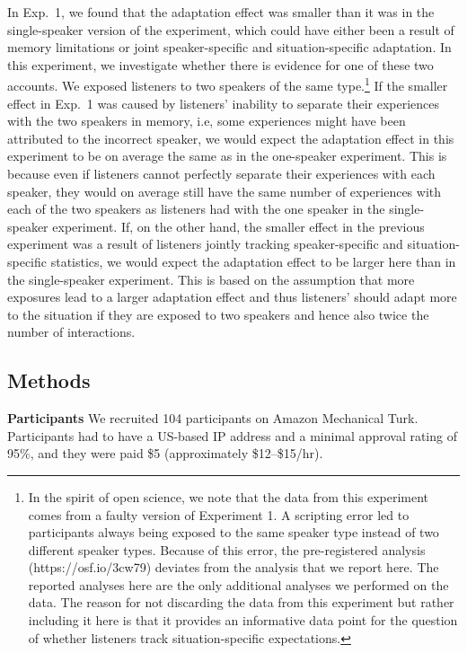 \documentclass[10pt,letterpaper]{article}
\begin{document}
In Exp.~1, we found that the adaptation effect was smaller than it was in the single-speaker version of the experiment,
which could have either been a result of memory limitations or joint speaker-specific and situation-specific adaptation. In this experiment, we investigate
whether there is evidence for one of these two accounts. We 
exposed listeners to two speakers of the same type.\footnote{
In the spirit of open science, we note that the data from this 
experiment comes from a faulty version of Experiment 1. 
A scripting error led to  participants always being exposed to the 
same speaker type instead of two different speaker types. Because 
of this error, the pre-registered analysis (https://osf.io/3cw79) 
deviates from the analysis that we report here. The reported analyses 
here are the only additional analyses we performed on the data. The 
reason for not discarding the data from this experiment but rather including 
it here is that it provides  an informative data point for the question of whether
listeners track situation-specific expectations.
}
If the smaller effect in Exp.~1 was caused by listeners' inability to separate their experiences with the two speakers in memory, i.e, some experiences might have been attributed to the incorrect speaker, we would expect the adaptation effect in this experiment to be on average the same as in the one-speaker experiment. This is because even if listeners cannot perfectly separate their experiences with each speaker, they would on average still have the same number of experiences with each of the two speakers as listeners had with the one speaker in the single-speaker experiment. If, on the other hand, the smaller effect in the previous experiment was a result of listeners jointly tracking speaker-specific and situation-specific statistics, we would expect the adaptation effect to be larger here than in the single-speaker experiment. This is based on the assumption that more exposures lead to a larger adaptation effect and thus listeners' should adapt more to the situation if they are exposed to two speakers and hence also twice the number of interactions.

\subsection{Methods}

\noindent \textbf{Participants} We recruited 104 participants on Amazon Mechanical Turk. 
Participants had to have a US-based IP address and a minimal approval rating of 
95\%, and they were paid \$5 (approximately \$12--\$15/hr).  
\end{document}
